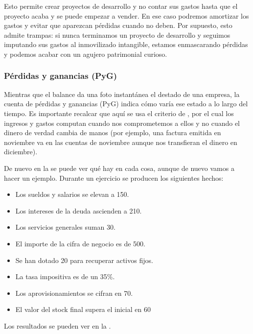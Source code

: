 \documentclass[nochap,palatino,shortheader]{apuntes}
\begin{document}
Esto permite crear proyectos de desarrollo y no contar sus gastos hasta que el proyecto acaba y se puede empezar a vender. En ese caso podremos amortizar los gastos y evitar que aparezcan pérdidas cuando no deben. Por supuesto, esto admite trampas: si nunca terminamos un proyecto de desarrollo y seguimos imputando sus gastos al inmovilizado intangible, estamos enmascarando pérdidas y podemos acabar con un agujero patrimonial curioso.

\subsubsection{Pérdidas y ganancias (PyG)}

Mientras que el balance da una foto instantánea el destado de una empresa, la cuenta de pérdidas y ganancias (PyG) indica cómo varía ese estado a lo largo del tiempo. Es importante recalcar que aquí se usa el criterio de , por el cual los ingresos y gastos computan cuando nos comprometemos a ellos y no cuando el dinero de verdad cambia de manos (por ejemplo, una factura emitida en noviembre va en las cuentas de noviembre aunque nos transfieran el dinero en diciembre).

De nuevo en la  se puede ver qué hay en cada cosa, aunque de nuevo vamos a hacer un ejemplo. Durante un ejercicio se producen los siguientes hechos:

\begin{itemize}
\item Los sueldos y salarios se elevan a 150.
\item Los intereses de la deuda ascienden a 210.
\item Los servicios generales suman 30.
\item El importe de la cifra de negocio es de 500.
\item Se han dotado 20 para recuperar activos fijos.
\item La tasa impositiva es de un 35\%.
\item Los aprovisionamientos se cifran en 70.
\item El valor del stock final supera el inicial en 60
\end{itemize}

Los resultados se pueden ver en la .
\end{document}
